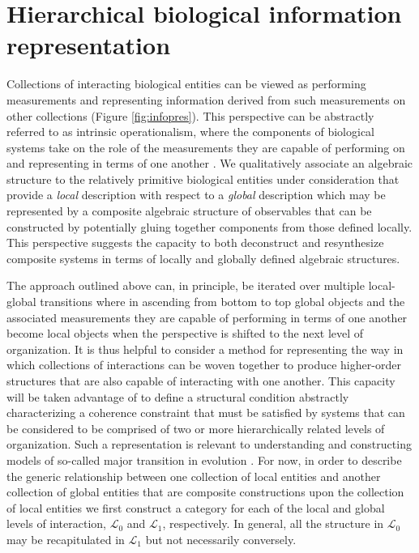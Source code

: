 \documentclass[aps,twocolumn]{revtex4-1}
\begin{document}

\section{Hierarchical biological information representation}
Collections of interacting biological entities can be viewed as performing measurements and representing information derived from such measurements on other collections (Figure \ref{fig:infopres}). This perspective can be abstractly referred to as intrinsic operationalism, where the components of biological systems take on the role of the measurements they are capable of performing on and representing in terms of one another \cite{Wolkenhauer2007,Houle2011}. We qualitatively associate an algebraic structure to the relatively primitive biological entities under consideration that provide a {\it local} description with respect to a {\it global} description which may be represented by a composite algebraic structure of observables that can be constructed by potentially gluing together components from those defined locally. This perspective suggests the capacity to both deconstruct and resynthesize composite systems in terms of locally and globally defined algebraic structures.

The approach outlined above can, in principle, be iterated over multiple local-global transitions where in ascending from bottom to top global objects and the associated measurements they are capable of performing in terms of one another become local objects when the perspective is shifted to the next level of organization. It is thus helpful to consider a method for representing the way in which collections of interactions can be woven together to produce higher-order structures that are also capable of interacting with one another. This capacity will be taken advantage of to define a structural condition abstractly characterizing a coherence constraint that must be satisfied by systems that can be considered to be comprised of two or more hierarchically related levels of organization. Such a representation is relevant to understanding and constructing models of so-called major transition in evolution \cite{MaynardSmith1995,Okasha2006,Calcott2011}. For now, in order to describe the generic relationship between one collection of local entities and another collection of global entities that are composite constructions upon the collection of local entities we first construct a category for each of the local and global levels of interaction, $\mathcal{L}_0$ and $\mathcal{L}_1$, respectively. In general, all the structure in $\mathcal{L}_0$ may be recapitulated in $\mathcal{L}_1$ but not necessarily conversely.
\end{document}
